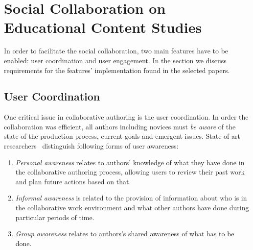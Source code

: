 \documentclass[ngerman,UKenglish,table]{scrbook}
\begin{document}



\section{Social Collaboration on Educational Content Studies}

In order to facilitate the social collaboration, two main features have to be enabled: user coordination and user engagement.
In the section we discuss requirements for the features' implementation found in the selected papers. 

\subsection{User Coordination}

One critical issue in collaborative authoring is the user coordination. 
In order the collaboration was efficient, all authors including novices must \emph{be aware} of the state of the production process, current goals and emergent issues.
State-of-art researchers~\cite{Nurjanah2011} distinguish following forms of user awareness: 

\begin{enumerate}
\item \emph{Personal awareness} relates to authors' knowledge of what they have done in the collaborative authoring process, allowing users to review their past work and plan future actions based on that.
\item \emph{Informal awareness} is related to the provision of information about who is in the collaborative work environment and what other authors have done during particular periods of time.
\item \emph{Group awareness} relates to authors's shared awareness of what has to be done.
\end{enumerate} 
\end{document}
